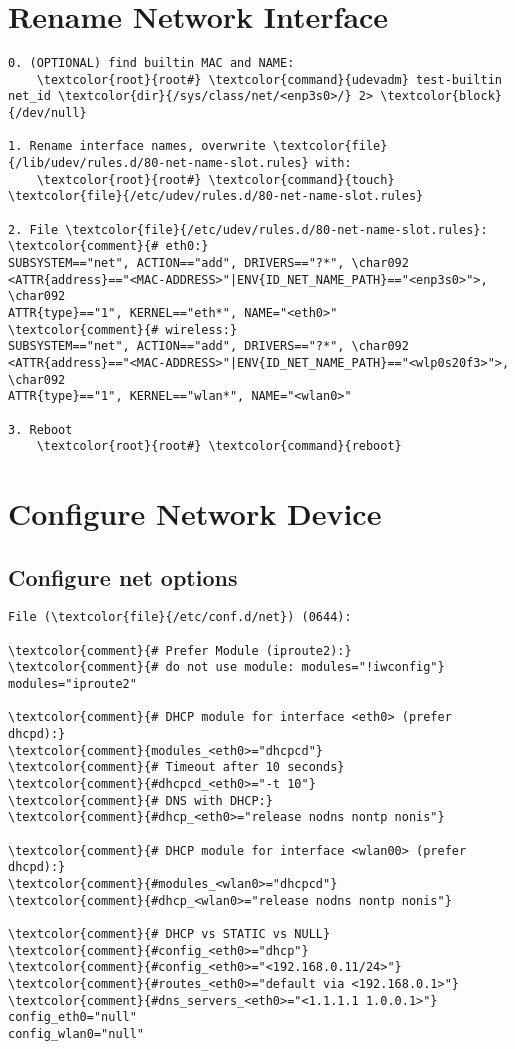 \documentclass[10pt, a4paper, onecolumn, openany]{book}         %
\begin{document}
\section{Rename Network Interface}
\begin{Verbatim}[commandchars=\\\{\}]
0. (OPTIONAL) find builtin MAC and NAME:
    \textcolor{root}{root#} \textcolor{command}{udevadm} test-builtin net_id \textcolor{dir}{/sys/class/net/<enp3s0>/} 2> \textcolor{block}{/dev/null}

1. Rename interface names, overwrite \textcolor{file}{/lib/udev/rules.d/80-net-name-slot.rules} with:
    \textcolor{root}{root#} \textcolor{command}{touch} \textcolor{file}{/etc/udev/rules.d/80-net-name-slot.rules}
    
2. File \textcolor{file}{/etc/udev/rules.d/80-net-name-slot.rules}:
\textcolor{comment}{# eth0:}
SUBSYSTEM=="net", ACTION=="add", DRIVERS=="?*", \char092
<ATTR{address}=="<MAC-ADDRESS>"|ENV{ID_NET_NAME_PATH}=="<enp3s0>">, \char092
ATTR{type}=="1", KERNEL=="eth*", NAME="<eth0>"
\textcolor{comment}{# wireless:}
SUBSYSTEM=="net", ACTION=="add", DRIVERS=="?*", \char092
<ATTR{address}=="<MAC-ADDRESS>"|ENV{ID_NET_NAME_PATH}=="<wlp0s20f3>">, \char092
ATTR{type}=="1", KERNEL=="wlan*", NAME="<wlan0>"

3. Reboot
    \textcolor{root}{root#} \textcolor{command}{reboot}
\end{Verbatim}

\section{Configure Network Device}
\subsection{Configure net options}
\begin{Verbatim}[commandchars=\\\{\}]
File (\textcolor{file}{/etc/conf.d/net}) (0644):

\textcolor{comment}{# Prefer Module (iproute2):}
\textcolor{comment}{# do not use module: modules="!iwconfig"}
modules="iproute2"

\textcolor{comment}{# DHCP module for interface <eth0> (prefer dhcpd):}
\textcolor{comment}{modules_<eth0>="dhcpcd"}
\textcolor{comment}{# Timeout after 10 seconds}
\textcolor{comment}{#dhcpcd_<eth0>="-t 10"}
\textcolor{comment}{# DNS with DHCP:}
\textcolor{comment}{#dhcp_<eth0>="release nodns nontp nonis"}

\textcolor{comment}{# DHCP module for interface <wlan00> (prefer dhcpd):}
\textcolor{comment}{#modules_<wlan0>="dhcpcd"}
\textcolor{comment}{#dhcp_<wlan0>="release nodns nontp nonis"}

\textcolor{comment}{# DHCP vs STATIC vs NULL}
\textcolor{comment}{#config_<eth0>="dhcp"}
\textcolor{comment}{#config_<eth0>="<192.168.0.11/24>"}
\textcolor{comment}{#routes_<eth0>="default via <192.168.0.1>"}
\textcolor{comment}{#dns_servers_<eth0>="<1.1.1.1 1.0.0.1>"}
config_eth0="null"
config_wlan0="null"
\end{Verbatim}
\end{document}
